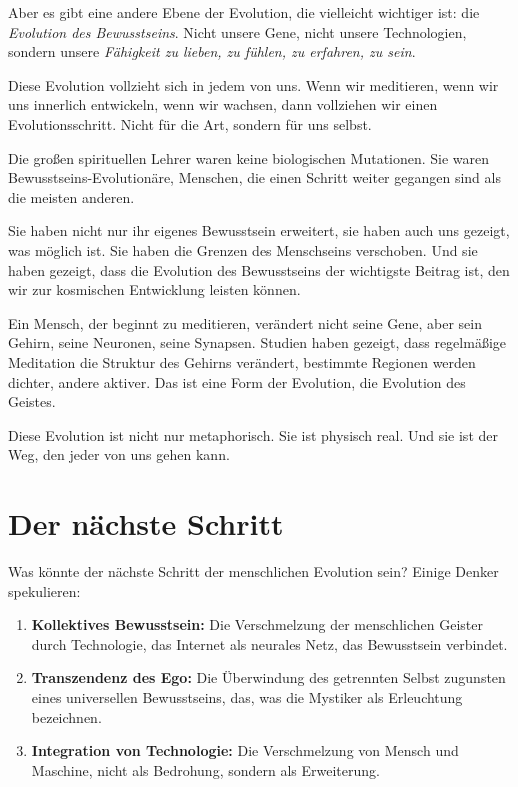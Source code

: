 Aber es gibt eine andere Ebene der Evolution, die vielleicht wichtiger ist: die \emph{Evolution des Bewusstseins}. Nicht unsere Gene, nicht unsere Technologien, sondern unsere \emph{Fähigkeit zu lieben, zu fühlen, zu erfahren, zu sein}.

Diese Evolution vollzieht sich in jedem von uns. Wenn wir meditieren, wenn wir uns innerlich entwickeln, wenn wir wachsen, dann vollziehen wir einen Evolutionsschritt. Nicht für die Art, sondern für uns selbst.

Die großen spirituellen Lehrer waren keine biologischen Mutationen. Sie waren Bewusstseins-Evolutionäre, Menschen, die einen Schritt weiter gegangen sind als die meisten anderen.

Sie haben nicht nur ihr eigenes Bewusstsein erweitert, sie haben auch uns gezeigt, was möglich ist. Sie haben die Grenzen des Menschseins verschoben. Und sie haben gezeigt, dass die Evolution des Bewusstseins der wichtigste Beitrag ist, den wir zur kosmischen Entwicklung leisten können.

\begin{bsp}
	Ein Mensch, der beginnt zu meditieren, verändert nicht seine Gene, aber sein Gehirn, seine Neuronen, seine Synapsen. Studien haben gezeigt, dass regelmäßige Meditation die Struktur des Gehirns verändert, bestimmte Regionen werden dichter, andere aktiver. Das ist eine Form der Evolution, die Evolution des Geistes.
\end{bsp}

Diese Evolution ist nicht nur metaphorisch. Sie ist physisch real. Und sie ist der Weg, den jeder von uns gehen kann.

\section{Der nächste Schritt}

Was könnte der nächste Schritt der menschlichen Evolution sein? Einige Denker spekulieren:

\begin{enumerate}
	\item \textbf{Kollektives Bewusstsein:} Die Verschmelzung der menschlichen Geister durch Technologie, das Internet als neurales Netz, das Bewusstsein verbindet.
	\item \textbf{Transzendenz des Ego:} Die Überwindung des getrennten Selbst zugunsten eines universellen Bewusstseins, das, was die Mystiker als \glqq Erleuchtung\grqq{} bezeichnen.
	\item \textbf{Integration von Technologie:} Die Verschmelzung von Mensch und Maschine, nicht als Bedrohung, sondern als Erweiterung.
\end{enumerate}

